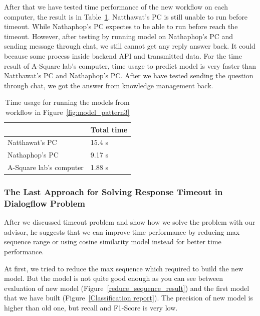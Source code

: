 \documentclass[12pt,oneside,openright,a4paper]{cpe-english-project}
\begin{document}
After that we have tested time performance of the new workflow on each computer,
the result is in Table~\ref*{tab:run_time_pattern3_table}.
Natthawat's PC is still unable to run before timeout.
While Nathaphop's PC expectes to be able to run before reach the timeout.
However, after testing by running model on Nathaphop's PC and sending message through chat,
we still cannot get any reply answer back. It could because some process inside backend API and transmitted data.
For the time result of A-Square lab's computer, time usage to predict model is very faster than
Natthawat's PC and Nathaphop's PC.
After we have tested sending the question through chat, we got the answer from knowledge management back.

\begin{table}[h]
	\centering
	\caption{Time usage for running the models from workflow in Figure~\ref*{fig:model_pattern3}}
	\label{tab:run_time_pattern3_table}
	\begin{adjustbox}{width=\textwidth}
		\begin{tabular}{|l|l|}
			\hline
			\backslashbox{Computer name}{Time usage to predict each model} &Total time \\ \hline
			Natthawat's PC & 15.4 s \\ \hline
			Nathaphop's PC & 9.17 s \\ \hline
			A-Square lab's computer & 1.88 s \\ \hline
		\end{tabular}
	\end{adjustbox}
\end{table}

\subsubsection{The Last Approach for Solving Response Timeout in Dialogflow Problem}
After we discussed timeout problem and show how we solve the problem with our advisor,
he suggests that we can improve time performance by reducing max sequence range or using
cosine similarity model instead for better time performance.

At first, we tried to reduce the max sequence which required to build the new model.
But the model is not quite good enough as you can see between evaluation of new model
(Figure~\ref{reduce_sequence_result}) and the first model that we have built
(Figure~\ref{Classification report}). The precision of new model is higher than old
one, but recall and F1-Score is very low.
\end{document}

